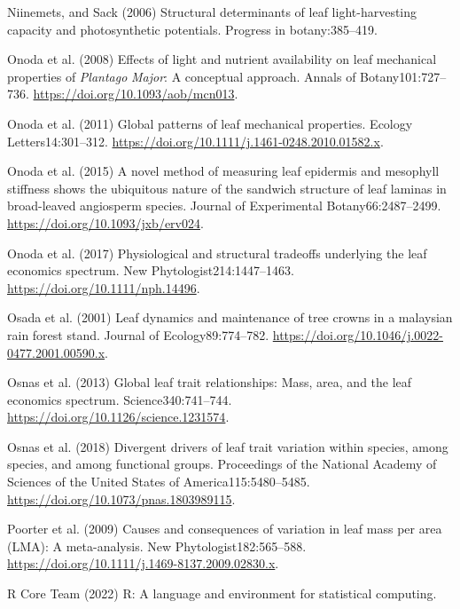 \documentclass[
  12pt,
  letterpaper,
  DIV=11,
  numbers=noendperiod]{scrartcl}
\newlength{\cslhangindent}
\newenvironment{CSLReferences}[2] %
 {\begin{list}{}{%
  \setlength{\itemindent}{0pt}
  \setlength{\leftmargin}{0pt}
  \setlength{\parsep}{0pt}
  \ifodd #1
   \setlength{\leftmargin}{\cslhangindent}
   \setlength{\itemindent}{-1\cslhangindent}
  \fi
  \setlength{\itemsep}{#2\baselineskip}}}
 {\end{list}}
\begin{document}
\begin{CSLReferences}{1}{1}
Niinemets, and Sack (2006) Structural determinants of leaf
light-harvesting capacity and photosynthetic potentials. Progress in
botany:385--419.

Onoda et al. (2008) Effects of light and nutrient availability on leaf
mechanical properties of {\emph{Plantago}}{ \emph{Major}}: {A}
conceptual approach. Annals of Botany101:727--736.
\url{https://doi.org/10.1093/aob/mcn013}.

Onoda et al. (2011) Global patterns of leaf mechanical properties.
Ecology Letters14:301--312.
\url{https://doi.org/10.1111/j.1461-0248.2010.01582.x}.

Onoda et al. (2015) A novel method of measuring leaf epidermis and
mesophyll stiffness shows the ubiquitous nature of the sandwich
structure of leaf laminas in broad-leaved angiosperm species. Journal of
Experimental Botany66:2487--2499.
\url{https://doi.org/10.1093/jxb/erv024}.

Onoda et al. (2017) Physiological and structural tradeoffs underlying
the leaf economics spectrum. New Phytologist214:1447--1463.
\url{https://doi.org/10.1111/nph.14496}.

Osada et al. (2001) Leaf dynamics and maintenance of tree crowns in a
malaysian rain forest stand. Journal of Ecology89:774--782.
\url{https://doi.org/10.1046/j.0022-0477.2001.00590.x}.

Osnas et al. (2013) Global leaf trait relationships: {Mass}, area, and
the leaf economics spectrum. Science340:741--744.
\url{https://doi.org/10.1126/science.1231574}.

Osnas et al. (2018) Divergent drivers of leaf trait variation within
species, among species, and among functional groups. Proceedings of the
National Academy of Sciences of the United States of
America115:5480--5485. \url{https://doi.org/10.1073/pnas.1803989115}.

Poorter et al. (2009) Causes and consequences of variation in leaf mass
per area ({LMA}): {A} meta-analysis. New Phytologist182:565--588.
\url{https://doi.org/10.1111/j.1469-8137.2009.02830.x}.

R Core Team (2022) R: {A} language and environment for statistical
computing.


\end{CSLReferences}
\end{document}
